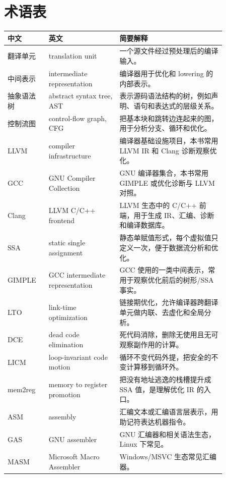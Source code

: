 \chapter*{术语表}

{\small
\begin{longtable}{
  >{\raggedright\arraybackslash}p{0.16\linewidth}
  >{\raggedright\arraybackslash}p{0.28\linewidth}
  >{\raggedright\arraybackslash}p{0.42\linewidth}
}
\toprule
中文 & 英文 & 简要解释 \\
\midrule
翻译单元 & translation unit & 一个源文件经过预处理后的编译输入。 \\
中间表示 & intermediate representation & 编译器用于优化和 lowering 的内部表示。 \\
抽象语法树 & abstract syntax tree, AST & 表示源码语法结构的树，例如声明、语句和表达式的层级关系。 \\
控制流图 & control-flow graph, CFG & 把基本块和跳转边连起来的图，用于分析分支、循环和优化。 \\
LLVM & compiler infrastructure & 编译器基础设施项目，本书常用 LLVM IR 和 Clang 诊断观察优化。 \\
GCC & GNU Compiler Collection & GNU 编译器集合，本书常用 GIMPLE 或优化诊断与 LLVM 对照。 \\
Clang & LLVM C/C++ frontend & LLVM 生态中的 C/C++ 前端，用于生成 IR、汇编、诊断和编译数据库。 \\
SSA & static single assignment & 静态单赋值形式，每个虚拟值只定义一次，便于数据流分析和优化。 \\
GIMPLE & GCC intermediate representation & GCC 使用的一类中间表示，常用于观察优化前后的树形/SSA 事实。 \\
LTO & link-time optimization & 链接期优化，允许编译器跨翻译单元做内联、去虚化和全局分析。 \\
DCE & dead code elimination & 死代码消除，删除无使用且无可观察副作用的计算。 \\
LICM & loop-invariant code motion & 循环不变代码外提，把安全的不变计算移到循环外。 \\
mem2reg & memory to register promotion & 把没有地址逃逸的栈槽提升成 SSA 值，是理解优化 IR 的入口。 \\
ASM & assembly & 汇编文本或汇编语言层表示，用助记符表达机器指令。 \\
GAS & GNU assembler & GNU 汇编器和相关语法生态，Linux 下常见。 \\
MASM & Microsoft Macro Assembler & Windows/MSVC 生态常见汇编器。 \\

\end{longtable}}

